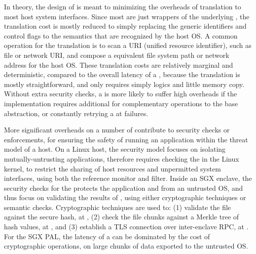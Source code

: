 In theory, the design of \thehostabi{}
is meant to minimizing the overheads of translation to most host system interfaces.
Since most \hostapis{} are just wrappers
of the underlying \linuxapis{},
the translation cost is mostly reduced to simply replacing the generic identifiers and control flags
to the semantics that are recognized by the host OS.
A common operation
for the translation is to scan a URI (unified resource identifier), such as file or network URI,
and compose a equivalent file system path or network address
for the host OS.
These translation costs
are relatively marginal and deterministic, compared to the overall latency of a \hostapi{},
because the translation is mostly straightforward,
and only requires simply logics
and little memory copy.
Without extra security checks,
a \hostapi{} is more likely to suffer high overheads if the implementation
requires additional \linuxapis{} for complementary operations
to the base abstraction,
or constantly retrying a \linuxapis{} at failures.



More significant overheads
on a number of \hostapis{} contribute to security checks or enforcements,
for ensuring the safety of running an application
within the threat model
of a host.
On a Linux host, the security model
focuses on isolating mutually-untrusting applications,
therefore requires checking
the \hostapis{} in the Linux kernel,
to restrict the sharing of host resources and unpermitted system interfaces,
using both the reference monitor and \seccomp{} filter.
Inside an SGX enclave, the security checks
for the \hostapis{}
protects the application and \libos{} from an untrusted OS,
and thus focus on validating the results of \linuxapis{},
using either cryptographic techniques or semantic checks.
Cryptographic techniques are used to: (1) validate the file against the secure hash, at , (2) check the file chunks against a Merkle tree of hash values, at , and (3) establish a TLS connection over inter-enclave RPC, at .
For the SGX PAL,
the latency of a \hostapi{} can be dominated
by the cost of cryptographic operations,
on large chunks of data exported to the untrusted OS.


